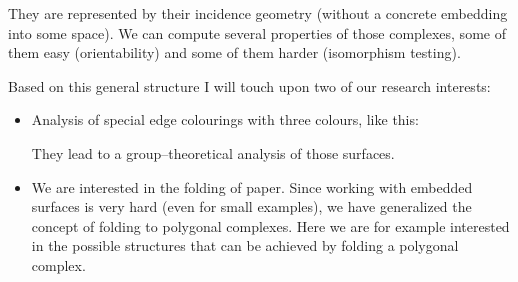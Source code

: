 \documentclass{scrartcl}
\begin{document}
\begin{center}
        \end{center} 

    They are represented by their incidence geometry (without a concrete
    embedding into some space).
    We can compute several properties of those
    complexes, some of them easy (orientability) and some of them harder
    (isomorphism testing).

    Based on this general structure I will touch upon two of our research
    interests:
    \begin{itemize}
        \item Analysis of special edge colourings with three colours,
                like this:
            \begin{center}
            \end{center}
            They lead to a group--theoretical analysis of those surfaces.
        \item We are interested in the folding of paper. Since working with
            embedded surfaces is very hard (even for small examples), we have
            generalized the concept of folding to polygonal complexes. Here we
            are for example interested in the possible structures that can be
            achieved by folding a polygonal complex.
    \end{itemize}
\end{document}
